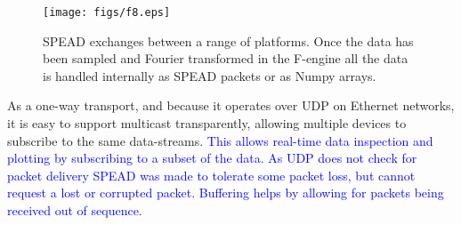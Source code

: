 \label{sec:SPEAD}
\begin{figure}
\texttt{[image: figs/f8.eps]} 
\caption{SPEAD exchanges between a range of platforms. Once the data has been sampled and Fourier transformed in the F-engine all the data is handled internally as SPEAD packets or as Numpy arrays.}
\label{fig:SPEAD}
\end{figure}

As a one-way transport, and because it operates over UDP on Ethernet
networks, it is easy to support multicast transparently, allowing
multiple devices to subscribe to the same data-streams.
\textcolor{blue}{This allows
real-time data inspection and plotting by subscribing to a subset of the 
data. As UDP does not check for packet delivery SPEAD was made to tolerate
some packet loss, but cannot request a lost or corrupted packet.
Buffering helps by allowing for packets being received out of sequence.}


